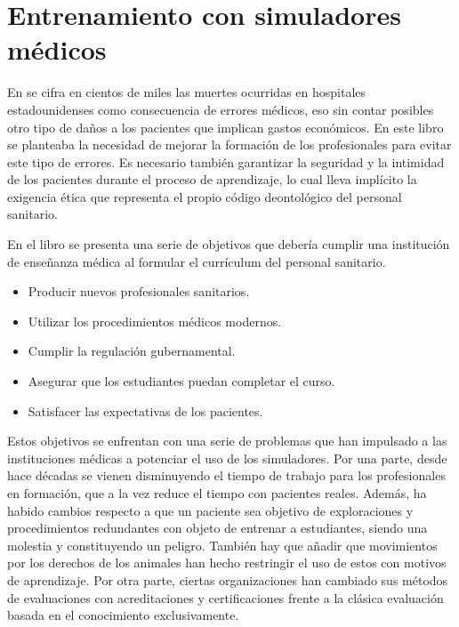 \section{Entrenamiento con simuladores médicos}
\label{art:learning}



En \cite{donaldson2000err} se cifra en cientos de miles las muertes ocurridas en hospitales estadounidenses como consecuencia de errores médicos, eso sin contar posibles otro tipo de daños a los pacientes que implican gastos económicos. En este libro se planteaba la necesidad de mejorar la formación de los profesionales para evitar este tipo de errores. 
Es necesario también garantizar la seguridad y la intimidad de los pacientes durante el proceso de aprendizaje, lo cual lleva implícito la exigencia ética que representa el propio código deontológico del personal sanitario. 

En el libro \cite{dent2017practical} se presenta una serie de objetivos que debería cumplir una institución de enseñanza médica al formular el currículum del personal sanitario.
\begin{itemize}
    \item Producir nuevos profesionales sanitarios.
    \item Utilizar los procedimientos médicos modernos.
    \item Cumplir la regulación gubernamental.
    \item Asegurar que los estudiantes puedan completar el curso.
    \item Satisfacer las expectativas de los pacientes.
\end{itemize}

Estos objetivos se enfrentan con una serie de problemas que han impulsado a las instituciones médicas a potenciar el uso de los simuladores.
Por una parte,  desde hace décadas se vienen disminuyendo el tiempo de trabajo para los profesionales en formación, que a la vez reduce el tiempo con pacientes reales. Además,  ha habido cambios respecto a que un paciente sea objetivo de exploraciones y procedimientos redundantes con objeto de entrenar a estudiantes, siendo una molestia y constituyendo un peligro. También hay que añadir que movimientos por los derechos de los animales han hecho restringir el uso de estos con motivos de aprendizaje. Por otra parte, ciertas organizaciones han cambiado sus métodos de evaluaciones con acreditaciones y certificaciones frente a la clásica evaluación basada en el conocimiento exclusivamente.

